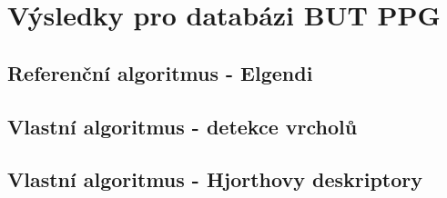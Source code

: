 \section{Výsledky pro databázi BUT PPG}
\label{sec:vysledky_butppg}

\subsection*{Referenční algoritmus - Elgendi}

\subsection*{Vlastní algoritmus - detekce vrcholů}

\subsection*{Vlastní algoritmus - Hjorthovy deskriptory}
